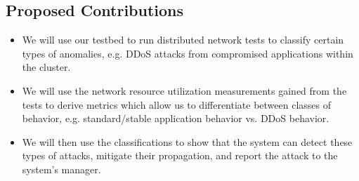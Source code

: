 \subsection{Proposed Contributions}
\begin{itemize}
	\item We will use our testbed to run distributed network tests
          to classify certain types of anomalies, e.g. DDoS attacks
          from compromised applications within the cluster.
	\item We will use the network resource utilization
          measurements gained from the tests to derive metrics which
          allow us to differentiate between classes of behavior,
          e.g. standard/stable application behavior vs. DDoS behavior.
	\item We will then use the classifications to show that the
          system can detect these types of attacks, mitigate their
          propagation, and report the attack to the system's manager.
\end{itemize}

\fi
